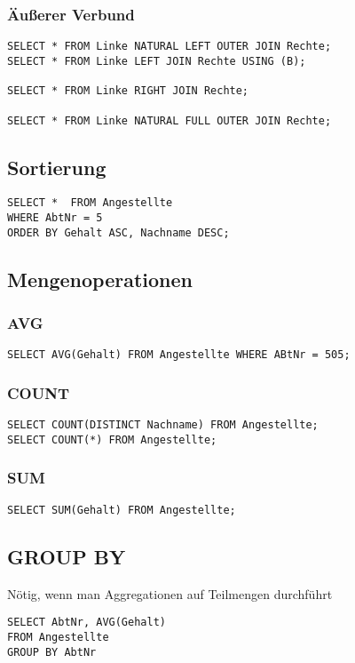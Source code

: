 \subsubsection{Äußerer Verbund}
\begin{verbatim}
SELECT * FROM Linke NATURAL LEFT OUTER JOIN Rechte;
SELECT * FROM Linke LEFT JOIN Rechte USING (B);

SELECT * FROM Linke RIGHT JOIN Rechte;

SELECT * FROM Linke NATURAL FULL OUTER JOIN Rechte;
\end{verbatim}
\subsection{Sortierung}
\begin{verbatim}
SELECT *  FROM Angestellte
WHERE AbtNr = 5
ORDER BY Gehalt ASC, Nachname DESC;
\end{verbatim}
\subsection{Mengenoperationen}
\subsubsection{AVG}
\begin{verbatim}
SELECT AVG(Gehalt) FROM Angestellte WHERE ABtNr = 505;
\end{verbatim}
\subsubsection{COUNT}
\begin{verbatim}
SELECT COUNT(DISTINCT Nachname) FROM Angestellte;
SELECT COUNT(*) FROM Angestellte;
\end{verbatim}
\subsubsection{SUM}
\begin{verbatim}
SELECT SUM(Gehalt) FROM Angestellte;
\end{verbatim}
\subsection{GROUP BY}
Nötig, wenn man Aggregationen auf Teilmengen durchführt
\begin{verbatim}
SELECT AbtNr, AVG(Gehalt)
FROM Angestellte
GROUP BY AbtNr
\end{verbatim}
